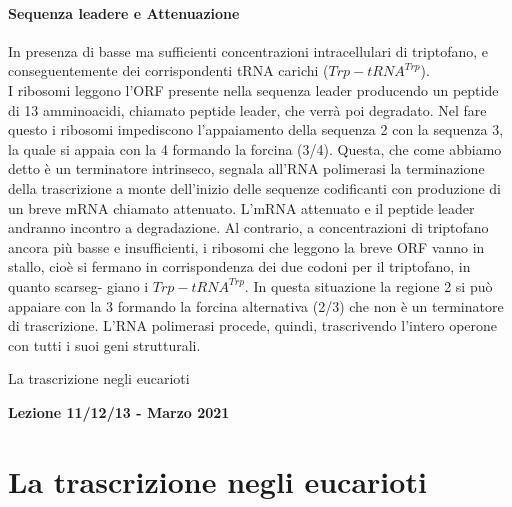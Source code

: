 \documentclass{article}
\begin{document}
\paragraph{Sequenza leadere e Attenuazione}
In presenza di basse ma
sufficienti concentrazioni intracellulari di triptofano, e conseguentemente dei
corrispondenti tRNA carichi ($Trp-tRNA^{Trp}$).\\
I ribosomi leggono l'ORF presente nella sequenza leader producendo un peptide di 13 amminoacidi, chiamato peptide leader, che verrà poi degradato. Nel fare questo i ribosomi
impediscono l'appaiamento della sequenza 2 con la sequenza 3, la quale si appaia con la 4 formando la forcina (3/4). Questa, che come abbiamo detto è un
terminatore intrinseco, segnala all'RNA polimerasi la terminazione della trascrizione a monte dell'inizio delle sequenze codificanti con produzione di un breve
mRNA chiamato attenuato. L'mRNA attenuato e il peptide leader andranno
incontro a degradazione. Al contrario, a concentrazioni di triptofano ancora più
basse e insufficienti, i ribosomi che leggono la breve ORF vanno in stallo, cioè si fermano in corrispondenza dei due codoni per il triptofano, in quanto scarseg-
giano i $Trp-tRNA^{Trp}$. In questa situazione la regione 2 si può appaiare con la 3
formando la forcina alternativa (2/3) che non è un terminatore di trascrizione.
L'RNA polimerasi procede, quindi, trascrivendo l'intero operone con tutti i suoi
geni strutturali.


\begin{titlepage}
    \begin{center}
        \vspace*{1cm}
        \huge
        La trascrizione negli eucarioti
            
        \vspace{1.5cm}
        
        \Large
        \textbf{Lezione 11/12/13 - Marzo 2021}

        \vspace{0.8cm}

    \end{center}
\end{titlepage}
\setcounter{page}{59}
\section{La trascrizione negli eucarioti}
\end{document}
